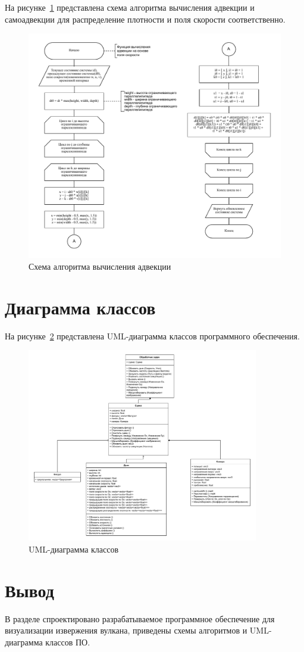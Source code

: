 На рисунке~\ref{fig:advect} представлена схема алгоритма вычисления адвекции и самоадвекции для распределение плотности и поля скорости соответственно.


\begin{figure}[H]
	\centering
	\includegraphics[width=1.0\textwidth,page=1]{assets/img/advect.pdf}
	\caption{Схема алгоритма вычисления адвекции}
	\label{fig:advect}
\end{figure}

\section{Диаграмма классов}

На рисунке~\ref{fig:uml} представлена UML-диаграмма классов программного обеспечения.

\begin{figure}[H]
	\centering
	\includegraphics[width=0.9\textwidth,page=1]{assets/img/smoke_uml.pdf}
	\caption{UML-диаграмма классов}
	\label{fig:uml}
\end{figure}

\section*{Вывод}
В разделе спроектировано разрабатываемое программное обеспечение для визуализации извержения вулкана, приведены схемы алгоритмов и UML-диаграмма классов ПО.
